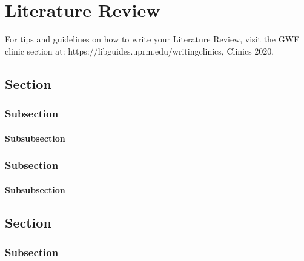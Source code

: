 


\chapter{Literature Review}  
\noindent For tips and guidelines on how to write your Literature Review, visit the GWF clinic section at: https://libguides.uprm.edu/writingclinics, Clinics 2020.

\section{Section}
\noindent \lipsum[1][1-3] %

\subsection{Subsection}
\noindent \lipsum[1][3-5] %

\subsubsection{Subsubsection}
\noindent \blindtext %

\subsection{Subsection}
\noindent \lipsum[1][2-5] %

\subsubsection{Subsubsection}
\noindent \lipsum[1][1-5] %

\section{Section}
\noindent \lipsum[1][5-8] %

\subsection{Subsection}
\noindent \lipsum[1][9-15] %

